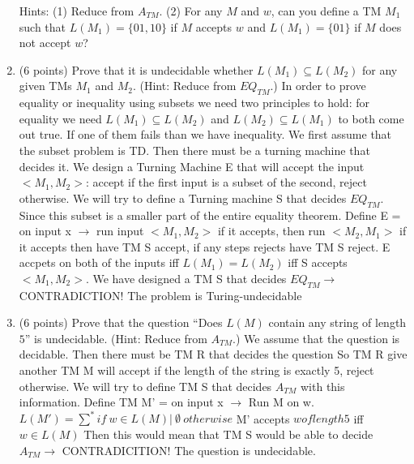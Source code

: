 \documentclass[11pt]{article}
\begin{document}
\begin{enumerate}
Hints: (1) Reduce from $A_{TM}$. (2) For any $M$ and $w$, can you define a TM $M_1$ such that $L(M_1)=\{01, 10\}$ if $M$ accepts $w$ and $L(M_1)=\{01\}$ if $M$ does not accept $w$?



\item (6 points) Prove that it is undecidable whether $L(M_1)\subseteq L(M_2)$ for any given TMs $M_1$ and $M_2$. (Hint: Reduce from $EQ_{TM}$.)\newline 
In order to prove equality or inequality using subsets we need two principles to hold: for equality we need  $L(M_1)\subseteq L(M_2)$ and  $L(M_2)\subseteq L(M_1)$ to both come out true. If one of them fails than we have inequality. \newline 
We first assume that the subset problem is TD. Then there must be a turning machine that decides it. \newline 
We design a Turning Machine E that will accept the input $<M_1, M_2>$: accept if the first input is a subset of the second, reject otherwise. We will try to define a Turning machine S that decides $EQ_{TM}$. Since this subset is a smaller part of the entire equality theorem. \newline 
Define E = on input x $\rightarrow$ run input $<M_1, M_2>$ if it accepts, then run $<M_2, M_1>$ if it accepts then have TM S accept, if any steps rejects have TM S reject. E accpets on both of the inputs iff $L(M_1) = L(M_2)$ iff S accepts $<M_1, M_2>$. \newline 
We have designed a TM S that decides $EQ_{TM} \rightarrow$ CONTRADICTION!  \newline 
The problem is Turing-undecidable

\item (6 points) Prove that the question ``Does $L(M)$ contain any string of length $5$'' is undecidable. (Hint: Reduce from $A_{TM}$.)
We assume that the question is decidable. Then there must be TM R that decides the question So TM R give another TM M will accept if the length of the string is exactly 5, reject otherwise. We will try to define TM S that decides $A_{TM}$ with this information. \newline 
Define TM M' = on input x $\rightarrow$ Run M on w. \newline 
$L(M') = \sum^* if\  w \in L(M) | \  \emptyset\ otherwise $ \newline 
M' accepts $w of length 5$ iff $w \in L(M)$ \newline 
Then this would mean that TM S would be able to decide $A_{TM} \rightarrow$ CONTRADICITION! \newline 
The question is undecidable. 

\end{enumerate}
\end{document}
